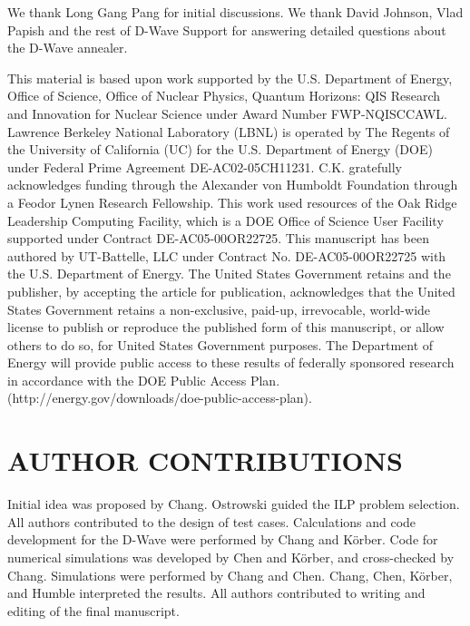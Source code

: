 \documentclass[10pt]{iopart}
\begin{document}
We thank Long Gang Pang for initial discussions.
We thank David Johnson, Vlad Papish and the rest of D-Wave Support for answering detailed questions about the D-Wave annealer.

This material is based upon work supported by the U.S. Department of Energy, Office of Science, Office of Nuclear Physics, Quantum Horizons: QIS Research and Innovation for Nuclear Science under Award Number FWP-NQISCCAWL.
Lawrence Berkeley National Laboratory (LBNL) is operated by The Regents of the University of California (UC) for the U.S. Department of Energy (DOE) under Federal Prime Agreement DE-AC02-05CH11231.
C.K. gratefully acknowledges funding through the Alexander von Humboldt Foundation through a Feodor Lynen Research Fellowship.
This work used resources of the Oak Ridge Leadership Computing Facility, which is a DOE Office of Science User Facility supported under Contract DE-AC05-00OR22725.
This manuscript has been authored by UT-Battelle, LLC under Contract No. DE-AC05-00OR22725 with the U.S. Department of Energy.
The United States Government retains and the publisher, by accepting the article for publication, acknowledges that the United States Government retains a non-exclusive, paid-up, irrevocable, world-wide license to publish or reproduce the published form of this manuscript, or allow others to do so, for United States Government purposes. The Department of Energy will provide public access to these results of federally sponsored research in accordance with the DOE Public Access Plan. (http://energy.gov/downloads/doe-public-access-plan).


\section{AUTHOR CONTRIBUTIONS}

Initial idea was proposed by Chang.
Ostrowski guided the ILP problem selection.
All authors contributed to the design of test cases.
Calculations and code development for the D-Wave were performed by Chang and K\"orber.
Code for numerical simulations was developed by Chen and K\"orber, and cross-checked by Chang.
Simulations were performed by Chang and Chen.
Chang, Chen, K\"orber, and Humble interpreted the results.
All authors contributed to writing and editing of the final manuscript.

\end{document}

